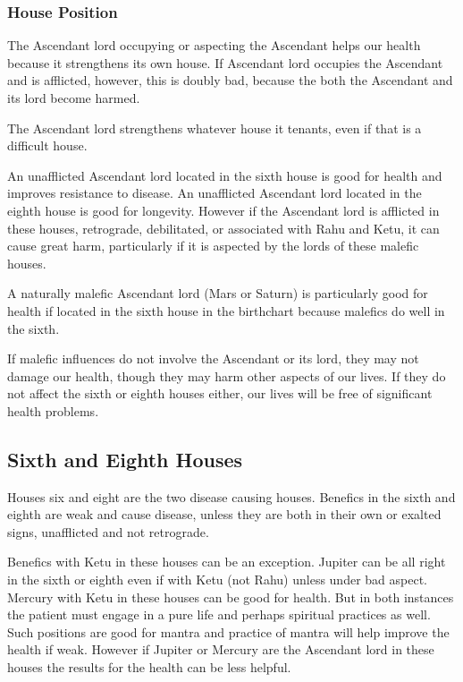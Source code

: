  

\subsubsection{House Position}

 

The Ascendant lord occupying or aspecting the Ascendant helps our health because it strengthens its own house. If Ascendant lord occupies the Ascendant and is afflicted, however, this is doubly bad, because the both the Ascendant and its lord become harmed.

 

The Ascendant lord strengthens whatever house it tenants, even if that is a difficult house.
 

An unafflicted Ascendant lord located in the sixth house is good for health and improves resistance to disease. An unafflicted Ascendant lord located in the eighth house is good for longevity. However if the Ascendant lord is afflicted in these houses, retrograde, debilitated, or associated with Rahu and Ketu, it can cause great harm, particularly if it is aspected by the lords of these malefic houses.

 

A naturally malefic Ascendant lord (Mars or Saturn) is particularly good for health if located in the sixth house in the birthchart because malefics do well in the sixth.
 

If malefic influences do not involve the Ascendant or its lord, they may not damage our health, though they may harm other aspects of our lives. If they do not affect the sixth or eighth houses either, our lives will be free of significant health problems.

 

\subsection{Sixth and Eighth Houses}
 

Houses six and eight are the two disease causing houses. Benefics in the sixth and eighth are weak and cause disease, unless they are both in their own or exalted signs, unafflicted and not retrograde.
 

Benefics with Ketu in these houses can be an exception. Jupiter can be all right in the sixth or eighth even if with Ketu (not Rahu) unless under bad aspect. Mercury with Ketu in these houses can be good for health. But in both instances the patient must engage in a pure life and perhaps spiritual practices as well. Such positions are good for mantra and practice of mantra will help improve the health if weak. However if Jupiter or Mercury are the Ascendant lord in these houses the results for the health can be less helpful.

